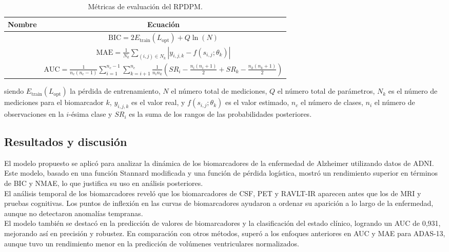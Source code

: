 \begin{table}[h!]
	\centering
	\begin{tabular}{|c|c|}
		\hline
		\textbf{Nombre} & \textbf{Ecuación} \\
		\hline
		\text{BIC} & \( \text{BIC} = 2 E_{\text{train}}(L_{\text{opt}}) + Q \ln(N) \) \\
		\hline
		\text{MAE} & \( \text{MAE} = \frac{1}{N_k} \sum_{(i,j) \in N_k} \left| y_{i,j,k} - f(s_{i,j}; \theta_k) \right| \) \\
		\hline
		\text{AUC} & \( \text{AUC} = \frac{1}{n_c (n_c - 1)} \sum_{i=1}^{n_c - 1} \sum_{k=i+1}^{n_c} \frac{1}{n_i n_k} \left( SR_i - \frac{n_i (n_i + 1)}{2} + SR_k - \frac{n_k (n_k + 1)}{2} \right) \) \\
		\hline
	\end{tabular}
	\caption{Métricas de evaluación del RPDPM.}
\end{table}

siendo \(E_{\text{train}}(L_{\text{opt}})\) la pérdida de entrenamiento, \(N\) el número total de mediciones, \(Q\) el número total de parámetros, \(N_k\) es el número de mediciones para el biomarcador \(k\), \(y_{i,j,k}\) es el valor real, y \(f(s_{i,j}; \theta_k)\) es el valor estimado, \(n_c\) el número de clases, \(n_i\) el número de observaciones en la \(i\)-ésima clase y \(SR_i\) es la suma de los rangos de las probabilidades posteriores.\\

\subsection{Resultados y discusión}
El modelo propuesto se aplicó para analizar la dinámica de los biomarcadores de la enfermedad de Alzheimer utilizando datos de ADNI. Este modelo, basado en una función Stannard modificada y una función de pérdida logística, mostró un rendimiento superior en términos de BIC y NMAE, lo que justifica su uso en análisis posteriores.\\

El análisis temporal de los biomarcadores reveló que los biomarcadores de CSF, PET y RAVLT-IR aparecen antes que los de MRI y pruebas cognitivas. Los puntos de inflexión en las curvas de biomarcadores ayudaron a ordenar su aparición a lo largo de la enfermedad, aunque no detectaron anomalías tempranas.\\

El modelo también se destacó en la predicción de valores de biomarcadores y la clasificación del estado clínico, logrando un AUC de 0,931, mejorando así en precisión y robustez. En comparación con otros métodos, superó a los enfoques anteriores en AUC y MAE para ADAS-13, aunque tuvo un rendimiento menor en la predicción de volúmenes ventriculares normalizados.\\

